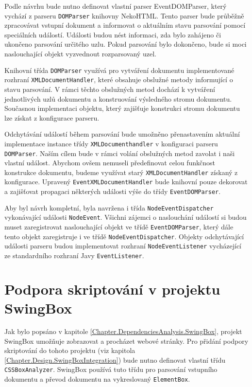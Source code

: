 Podle návrhu bude nutno definovat vlastní parser EventDOMParser, který vychází z parseru \texttt{DOMParser} knihovny NekoHTML. Tento parser bude průběžně zpracovávat vstupní dokument a informovat o aktuálním stavu parsování pomocí speciálních událostí. Události budou nést informaci, zda bylo zahájeno či ukončeno parsování určitého uzlu. Pokud parsování bylo dokončeno, bude si moci naslouchající objekt vyzvednout rozparsovaný uzel. 

Knihovní třída \texttt{DOMParser} využívá pro vytváření dokumentu implementované rozhraní \texttt{XMLDocumentHandler}, které obsahuje obslužné metody informující o stavu parsování. V rámci těchto obslužných metod dochází k vytváření jednotlivých uzlů dokumentu a konstruování výsledného stromu dokumentu. Současnou implementaci objektu, který zajišťuje konstrukci stromu dokumentu lze získat z konfigurace parseru.

Odchytávání událostí během parsování bude umožněno přenastavením aktuální implementace instance třídy \texttt{XMLDocumenthandler} v konfiguraci parseru \texttt{DOMParser}. Naším cílem bude v rámci volání obslužných metod zavolat i naši vlastní událost. Abychom ovšem nemuseli předefinovat celou funkčnost konstrukce dokumentu, budeme využívat starý \texttt{XMLDocumentHandler} získaný z konfigurace. Upravený \texttt{EventXMLDocumentHandler} bude knihovní pouze dekorovat a zajišťovat propagaci některých události výše do třídy \texttt{EventDOMParser}. 

Aby byl návrh kompletní, byla navržena i třída \texttt{NodeEventDispatcher} vykonávající události \texttt{NodeEvent}. Všichni zájemci o naslouchání událostí si budou muset zaregistrovat naslouchající objekt ve třídě \texttt{EventDOMParser}, který dále tento objekt zaregistruje i ve třídě \texttt{NodeEventDispatcher}. Objekty odchytávající události parseru budou implementovat rozhraní \texttt{NodeEventListener} vycházející ze standardního rozhraní Javy \texttt{EventListener}.

\section{Podpora skriptování v projektu SwingBox}
\label{Chapter.Design.ScriptsInSwingBox}

Jak bylo popsáno v kapitole \ref{Chapter.DependenciesAnalysis.SwingBox}, projekt SwingBox umožňuje zobrazovat a procházet webové stránky. Pro přidání podpory skriptování do tohoto projektu (viz kapitola \ref{Chapter.Design.SwingBoxIntegration}) bude nutno definovat vlastní třídu \texttt{CSSBoxAnalyzer}. SwingBox používá tuto třídu pro parsování vstupního dokumentu a převod dokumentu na vykreslovaný \texttt{ElementBox}.   


